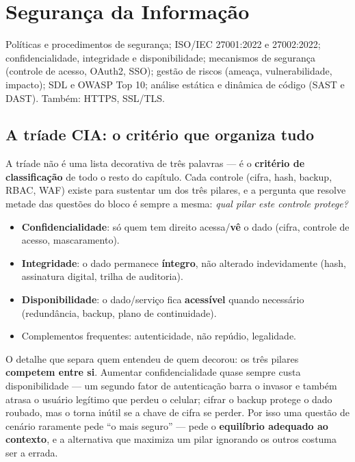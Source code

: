 \chapter{Segurança da Informação}
\label{cap:seguranca-teoria}

\begin{edital}
Políticas e procedimentos de segurança; ISO/IEC 27001:2022 e 27002:2022;
confidencialidade, integridade e disponibilidade; mecanismos de segurança
(controle de acesso, OAuth2, SSO); gestão de riscos (ameaça, vulnerabilidade,
impacto); SDL e OWASP Top 10; análise estática e dinâmica de código (SAST e
DAST). Também: HTTPS, SSL/TLS.
\end{edital}

\section{A tríade CIA: o critério que organiza tudo}

\begin{conceito}
A tríade não é uma lista decorativa de três palavras --- é o
\textbf{critério de classificação} de todo o resto do capítulo. Cada
controle (cifra, hash, backup, RBAC, WAF) existe para sustentar um dos
três pilares, e a pergunta que resolve metade das questões do bloco é
sempre a mesma: \textit{qual pilar este controle protege?}

\begin{itemize}
\item \textbf{Confidencialidade}: só quem tem direito acessa/\textbf{vê}
o dado (cifra, controle de acesso, mascaramento).
\item \textbf{Integridade}: o dado permanece \textbf{íntegro}, não
alterado indevidamente (hash, assinatura digital, trilha de auditoria).
\item \textbf{Disponibilidade}: o dado/serviço fica \textbf{acessível}
quando necessário (redundância, backup, plano de continuidade).
\item Complementos frequentes: autenticidade, não repúdio, legalidade.
\end{itemize}

O detalhe que separa quem entendeu de quem decorou: os três pilares
\textbf{competem entre si}. Aumentar confidencialidade quase sempre custa
disponibilidade --- um segundo fator de autenticação barra o invasor e
também atrasa o usuário legítimo que perdeu o celular; cifrar o backup
protege o dado roubado, mas o torna inútil se a chave de cifra se perder.
Por isso uma questão de cenário raramente pede “o mais seguro” --- pede o
\textbf{equilíbrio adequado ao contexto}, e a alternativa que maximiza um
pilar ignorando os outros costuma ser a errada.
\end{conceito}

